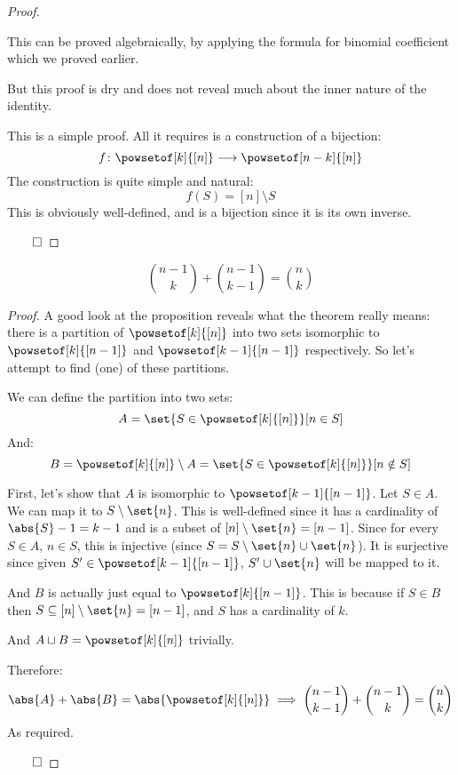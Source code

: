 \begin{proof}

	\begin{note}

		This can be proved algebraically, by applying the formula for binomial coefficient which we proved earlier.

		But this proof is dry and does not reveal much about the inner nature of the identity.

	\end{note}

	This is a simple proof. All it requires is a construction of a bijection:
	\[ f\colon\powsetof[k]{[n]}\longrightarrow\powsetof[n-k]{[n]} \]
	The construction is quite simple and natural:
	\[ f(S) = [n]\setminus S \]
	This is obviously well-defined, and is a bijection since it is its own inverse.

\hfill$\qed$

\end{proof}

\begin{prop*}

	\[ \binom{n-1}{k} + \binom{n-1}{k-1} = \binom{n}{k} \]

\end{prop*}

\begin{proof}

	A good look at the proposition reveals what the theorem really means: there is a partition of $\powsetof[k]{[n]}$ into
	two sets isomorphic to $\powsetof[k]{[n-1]}$ and $\powsetof[k-1]{[n-1]}$ respectively. So let's attempt to find (one) of
	these partitions.

	We can define the partition into two sets:
	\[ A=\set{S\in\powsetof[k]{[n]}}[n\in S] \]
	And:
	\[ B=\powsetof[k]{[n]}\setminus A = \set{S\in\powsetof[k]{[n]}}[n\notin S] \]

	First, let's show that $A$ is isomorphic to $\powsetof[k-1]{[n-1]}$. Let $S\in A$. We can map it to $S\setminus\set{n}$.
	This is well-defined since it has a cardinality of $\abs{S}-1=k-1$ and is a subset of $[n]\setminus\set{n}=[n-1]$.
	Since for every $S\in A$, $n\in S$, this is injective (since $S=S\setminus\set{n}\cup\set{n}$). 
	It is surjective since given $S'\in\powsetof[k-1]{[n-1]}$, $S'\cup\set{n}$ will be mapped to it.

	And $B$ is actually just equal to $\powsetof[k]{[n-1]}$. This is because if $S\in B$ then
	$S\subseteq[n]\setminus\set{n}=[n-1]$, and $S$ has a cardinality of $k$.

	And $A\sqcup B=\powsetof[k]{[n]}$ trivially.

	Therefore:
	\[ \abs{A} + \abs{B} = \abs{\powsetof[k]{[n]}} \implies \binom{n-1}{k-1}+\binom{n-1}{k} = \binom{n}{k} \]
	As required.

\hfill$\qed$

\end{proof}

